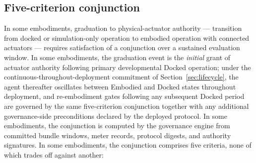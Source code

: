 \documentclass[a4paper,12pt]{article}
\begin{document}
\subsection{Five-criterion conjunction}
\label{sec:five-criteria}

In some embodiments, graduation to physical-actuator authority ---
transition from docked or simulation-only operation to embodied
operation with connected actuators --- requires satisfaction of a
conjunction over a sustained evaluation window. In some embodiments,
the graduation event is the \emph{initial} grant of actuator
authority following primary developmental Docked operation; under
the continuous-throughout-deployment commitment of
Section~\ref{sec:lifecycle}, the agent thereafter oscillates between
Embodied and Docked states throughout deployment, and re-embodiment
gates following any subsequent Docked period are governed by the
same five-criterion conjunction together with any additional
governance-side preconditions declared by the deployed protocol. In
some embodiments, the conjunction is computed by the governance engine
from committed bundle windows, meter records, protocol digests, and
authority signatures. In some embodiments, the conjunction comprises
five criteria, none of which trades off against another:
\end{document}
